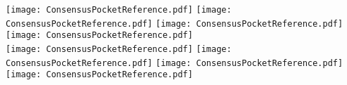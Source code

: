 \documentclass[letter,landscape]{article}
\begin{document}
	\texttt{[image: ConsensusPocketReference.pdf]}\hfill
	\texttt{[image: ConsensusPocketReference.pdf]}\hfill
	\texttt{[image: ConsensusPocketReference.pdf]}\hfill
	\texttt{[image: ConsensusPocketReference.pdf]}\\
	\texttt{[image: ConsensusPocketReference.pdf]}\hfill
	\texttt{[image: ConsensusPocketReference.pdf]}\hfill
	\texttt{[image: ConsensusPocketReference.pdf]}\hfill
	\texttt{[image: ConsensusPocketReference.pdf]}\hfill
\end{document}
